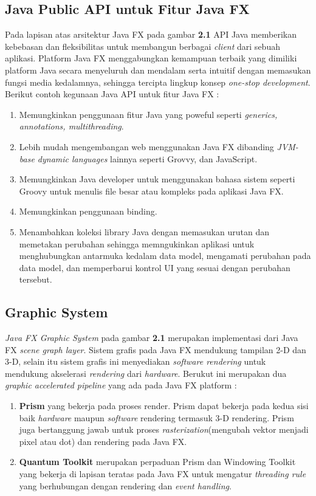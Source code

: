\subsection{Java Public API untuk Fitur Java FX}
\label{subs:API}
Pada lapisan atas arsitektur Java FX pada gambar \textbf{2.1} API Java memberikan kebebasan dan fleksibilitas untuk membangun berbagai \textit{client} dari sebuah aplikasi. Platform Java FX menggabungkan kemampuan terbaik yang dimiliki platform Java secara menyeluruh dan mendalam serta intuitif dengan memasukan fungsi media kedalamnya, sehingga tercipta lingkup konsep \textit{one-stop development}. Berikut contoh kegunaan Java API untuk fitur Java FX :\cite{javafx}
\begin{enumerate}
	\item Memungkinkan penggunaan fitur Java yang poweful seperti \textit{generics, annotations, multithreading}.
	\item Lebih mudah mengembangan web menggunakan Java FX dibanding \textit{JVM-base dynamic languages} lainnya seperti Grovvy, dan JavaScript.
	\item Memungkinkan Java developer untuk menggunakan bahasa sistem seperti Groovy untuk menulis file besar atau kompleks pada aplikasi Java FX.
	\item Memungkinkan penggunaan binding.
	\item Menambahkan koleksi library Java dengan memasukan urutan dan memetakan perubahan sehingga memngukinkan aplikasi untuk menghubungkan antarmuka kedalam data model, mengamati perubahan pada data model, dan memperbarui kontrol UI yang sesuai dengan perubahan tersebut.   
\end{enumerate}

\subsection{Graphic System}
\label{subs:Graphic_System}
\textit{Java FX Graphic System} pada gambar \textbf{2.1} merupakan implementasi dari Java FX \textit{scene graph layer}. Sistem grafis pada Java FX mendukung tampilan 2-D dan 3-D, selain itu sistem grafis ini menyediakan \textit{software rendering} untuk mendukung akselerasi \textit{rendering} dari \textit{hardware}. Berukut ini merupakan dua \textit{graphic accelerated pipeline} yang ada pada Java FX platform :\cite{javafx}
\begin{enumerate}
	\item \textbf{Prism} yang bekerja pada proses render. Prism dapat bekerja pada kedua sisi baik \textit{hardware} maupun \textit{software} rendering termasuk 3-D rendering. Prism juga bertanggung jawab untuk proses \textit{rasterization}(mengubah vektor menjadi pixel atau dot) dan rendering pada Java FX.
	\item \textbf{Quantum Toolkit} merupakan perpaduan Prism dan Windowing Toolkit yang bekerja di lapisan teratas pada Java FX untuk mengatur \textit{threading rule} yang berhubungan dengan rendering dan \textit{event handling}. 
\end{enumerate}

